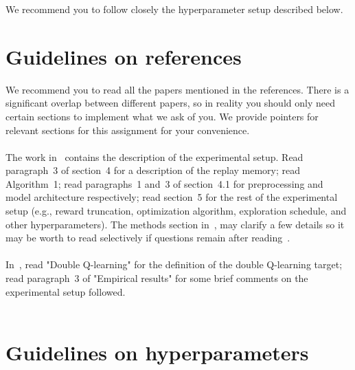 \documentclass[12pt]{article}
\begin{document}
We recommend you to follow closely the hyperparameter setup described below.

\section*{Guidelines on references}
We recommend you to read all the papers mentioned in the references. There is a significant overlap between different papers, so in reality you should only need certain sections to implement what we ask of you. We provide pointers for relevant sections for this assignment for your convenience. \\ \\
The work in~\cite{mnih2013playing} contains the description of the experimental setup. Read paragraph~3 of section~4 for a description of the replay memory; read Algorithm~1; read  paragraphs~1 and~3 of section~4.1 for preprocessing and model architecture respectively; read section~5 for the rest of the experimental setup (e.g., reward truncation, optimization algorithm, exploration schedule, and other hyperparameters). The methods section in~\cite{mnih2015human}, may clarify a few details so it may be worth to read selectively if questions remain after reading~\cite{mnih2013playing}. \\ \\
In~\cite{van2016deep}, read "Double Q-learning"  for the definition of the double Q-learning target; read paragraph~3 of "Empirical results" for some brief comments on the experimental setup followed. \\ \\

\section*{Guidelines on hyperparameters}
\end{document}
